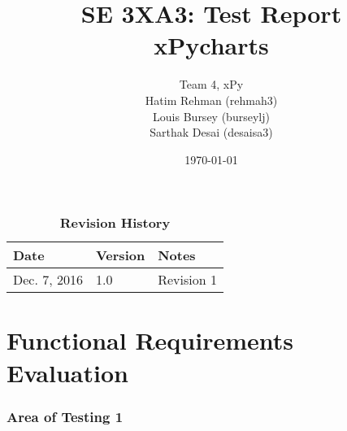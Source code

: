 \documentclass[12pt, titlepage]{article}
\title{SE 3XA3: Test Report\\xPycharts}
\author{Team 4, xPy
		\\ Hatim Rehman (rehmah3)
		\\ Louis Bursey (burseylj)
		\\ Sarthak Desai (desaisa3)
}
\date{\today}
\begin{document}
\maketitle
{}
\tableofcontents
\listoftables
\listoffigures
\begin{table}[bp]
\caption{\bf Revision History}
\begin{tabularx}{\textwidth}{p{3cm}p{2cm}X}
\toprule {\bf Date} & {\bf Version} & {\bf Notes}\\
\midrule
Dec. 7, 2016 &  1.0 & Revision 1 \\
\bottomrule
\end{tabularx}
\end{table}

\newpage
{}


\section{Functional Requirements Evaluation}

\subsubsection{Area of Testing 1}		
	\label{sec:3.1.1}
\end{document}
